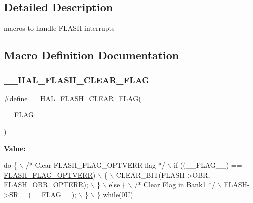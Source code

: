 \subsection{Detailed Description}
macros to handle F\+L\+A\+SH interrupts 



\subsection{Macro Definition Documentation}
\mbox{\label{group___f_l_a_s_h___interrupt_ga68e49c4675761e2ec35153e747de7622}} 
\subsubsection{\texorpdfstring{\+\_\+\+\_\+\+H\+A\+L\+\_\+\+F\+L\+A\+S\+H\+\_\+\+C\+L\+E\+A\+R\+\_\+\+F\+L\+AG}{\_\_HAL\_FLASH\_CLEAR\_FLAG}}
{\footnotesize\ttfamily \#define \+\_\+\+\_\+\+H\+A\+L\+\_\+\+F\+L\+A\+S\+H\+\_\+\+C\+L\+E\+A\+R\+\_\+\+F\+L\+AG(\begin{DoxyParamCaption}\item[{}]{\+\_\+\+\_\+\+F\+L\+A\+G\+\_\+\+\_\+ }\end{DoxyParamCaption})}

{\bfseries Value\+:}
\begin{DoxyCode}
\textcolor{keywordflow}{do} \{ \(\backslash\)
                          \textcolor{comment}{/* Clear FLASH\_FLAG\_OPTVERR flag */} \(\backslash\)
                          if ((\_\_FLAG\_\_) == \hyperlink{group___f_l_a_s_h___flag__definition_gacb2c4c991a260c3f110cd8c72f302864}{FLASH\_FLAG\_OPTVERR}) \(\backslash\)
                          \{ \(\backslash\)
                            CLEAR\_BIT(FLASH->OBR, FLASH\_OBR\_OPTERR); \(\backslash\)
                          \} \(\backslash\)
                          else \{ \(\backslash\)
                            \textcolor{comment}{/* Clear Flag in Bank1 */} \(\backslash\)
                            FLASH->SR  = (\_\_FLAG\_\_); \(\backslash\)
                          \} \(\backslash\)
                    \} \textcolor{keywordflow}{while}(0U)
\end{DoxyCode}


